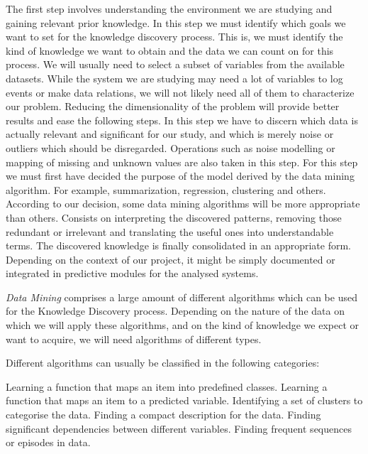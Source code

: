 \documentclass[a4paper,10pt]{report}
\begin{document}
\begin{enumerate}
  The first step involves understanding the environment we are studying and gaining relevant prior knowledge. In this step we must identify which goals we want to set for the knowledge discovery process. This is, we must identify the kind of knowledge we want to obtain and the data we can count on for this process.
  We will usually need to select a subset of variables from the available datasets. While the system we are studying may need a lot of variables to log events or make data relations, we will not likely need all of them to characterize our problem. Reducing the dimensionality of the problem will provide better results and ease the following steps.
  In this step we have to discern which data is actually relevant and significant for our study, and which is merely noise or outliers which should be disregarded. Operations such as noise modelling or mapping of missing and unknown values are also taken in this step.
  For this step we must first have decided the purpose of the model derived by the data mining algorithm. For example, summarization, regression, clustering and others. According to our decision, some data mining algorithms will be more appropriate than others.
  Consists on interpreting the discovered patterns, removing those redundant or irrelevant and translating the useful ones into understandable terms.
  The discovered knowledge is finally consolidated in an appropriate form. Depending on the context of our project, it might be simply documented or integrated in predictive modules for the analysed systems.
\end{enumerate}

\emph{Data Mining} comprises a large amount of different algorithms which can be used for the Knowledge Discovery process. Depending on the nature of the data on which we will apply these algorithms, and on the kind of knowledge we expect or want to acquire, we will need algorithms of different types.

Different algorithms can usually be classified in the following categories:

\begin{enumerate}
  Learning a function that maps an item into predefined classes.
  Learning a function that maps an item to a predicted variable.
  Identifying a set of clusters to categorise the data.
  Finding a compact description for the data.
  Finding significant dependencies between different variables.\cite{Zhao2003}
  Finding frequent sequences or episodes in data.\cite{Zhao2003a}\cite{Weiss2002}
\end{enumerate}
\end{document}
